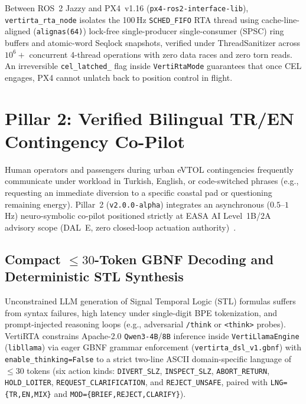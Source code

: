 \documentclass[conference,10pt]{IEEEtran}
\begin{document}
Between ROS~2 Jazzy and PX4~v1.16 (\texttt{px4-ros2-interface-lib}), \texttt{vertirta\_rta\_node} isolates the 100\,Hz \texttt{SCHED\_FIFO} RTA thread using cache-line-aligned (\texttt{alignas(64)}) lock-free single-producer single-consumer (SPSC) ring buffers and atomic-word Seqlock snapshots, verified under ThreadSanitizer across $10^6+$ concurrent 4-thread operations with zero data races and zero torn reads. An irreversible \texttt{cel\_latched\_} flag inside \texttt{VertiRtaMode} guarantees that once CEL engages, PX4 cannot unlatch back to position control in flight.



\section{Pillar 2: Verified Bilingual TR/EN Contingency Co-Pilot}
\label{sec:pillar2}

Human operators and passengers during urban eVTOL contingencies frequently communicate under workload in Turkish, English, or code-switched phrases (e.g., requesting an immediate diversion to a specific coastal pad or questioning remaining energy). Pillar~2 (\texttt{v2.0.0-alpha}) integrates an asynchronous ($0.5$--$1$\,Hz) neuro-symbolic co-pilot positioned strictly at EASA AI Level~1B/2A advisory scope (DAL~E, zero closed-loop actuation authority)~\cite{easa_ai_cp_2026}.

\subsection{Compact $\le 30$-Token GBNF Decoding and Deterministic STL Synthesis}

Unconstrained LLM generation of Signal Temporal Logic (STL) formulas suffers from syntax failures, high latency under single-digit BPE tokenization, and prompt-injected reasoning loops (e.g., adversarial \texttt{/think} or \texttt{<think>} probes). VertiRTA constrains Apache-2.0 \texttt{Qwen3-4B}/\texttt{8B} inference inside \texttt{VertiLlamaEngine} (\texttt{libllama}) via eager GBNF grammar enforcement (\texttt{vertirta\_dsl\_v1.gbnf}) with \texttt{enable\_thinking=False} to a strict two-line ASCII domain-specific language of $\le 30$ tokens (six action kinds: \texttt{DIVERT\_SLZ}, \texttt{INSPECT\_SLZ}, \texttt{ABORT\_RETURN}, \texttt{HOLD\_LOITER}, \texttt{REQUEST\_CLARIFICATION}, and \texttt{REJECT\_UNSAFE}, paired with \texttt{LNG=\{TR,EN,MIX\}} and \texttt{MOD=\{BRIEF,REJECT,CLARIFY\}}).
\end{document}
